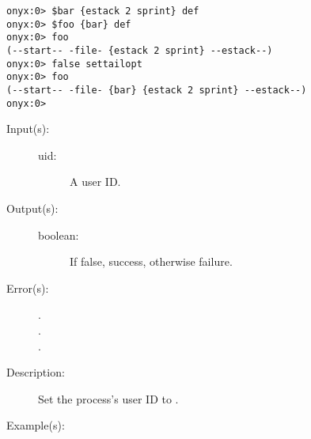 \begin{description}
\begin{description}
\begin{verbatim}
onyx:0> $bar {estack 2 sprint} def
onyx:0> $foo {bar} def
onyx:0> foo
(--start-- -file- {estack 2 sprint} --estack--)
onyx:0> false settailopt
onyx:0> foo
(--start-- -file- {bar} {estack 2 sprint} --estack--)
onyx:0>
		\end{verbatim}
	\end{description}
\label{systemdict:setuid}
\item[{\onyxop{uid}{setuid}{boolean}}: ]
	\begin{description}\item[]
	\item[Input(s): ]
		\begin{description}\item[]
		\item[uid: ]
			A user ID.
		\end{description}
	\item[Output(s): ]
		\begin{description}\item[]
		\item[boolean: ]
			If false, success, otherwise failure.
		\end{description}
	\item[Error(s): ]
		\begin{description}\item[]
		\item[.]
		\item[.]
		\item[.]
		\end{description}
	\item[Description: ]
		Set the process's user ID to .
	\item[Example(s): ]\begin{verbatim}


\end{verbatim}
\end{description}
\end{description}

